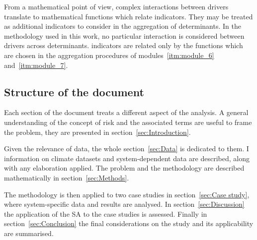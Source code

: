From a mathematical point of view, complex interactions between \glspl{driver} translate to mathematical functions which relate \glspl{indicator}. They may be treated as additional \glspl{indicator} to consider in the aggregation of \glspl{determinant}.\cite[39-40]{2008OECDHandbookOn}
In the methodology used in this work, no particular interaction is considered between \glspl{driver} across \glspl{determinant}. \Glspl{indicator} are related only by the functions which are chosen in the aggregation procedures of modules~\ref{itm:module_6} and~\ref{itm:module_7}.



\subsection{Structure of the document}
Each section of the document treats a different aspect of the analysis. A general understanding of the concept of \gls{risk} and the associated terms are useful to frame the problem, they are presented in section~\ref{sec:Introduction}.

Given the relevance of data, the whole section~\ref{sec:Data} is dedicated to them. I information on climate datasets and system-dependent data are described, along with any elaboration applied. The problem and the methodology are described mathematically in section~\ref{sec:Methods}.

The methodology is then applied to two case studies in section~\ref{sec:Case study}, where system-specific data and results are analysed. In section~\ref{sec:Discussion} the application of the \gls{SA} to the case studies is assessed. Finally in section~\ref{sec:Conclusion} the final considerations on the study and its applicability are summarised.
